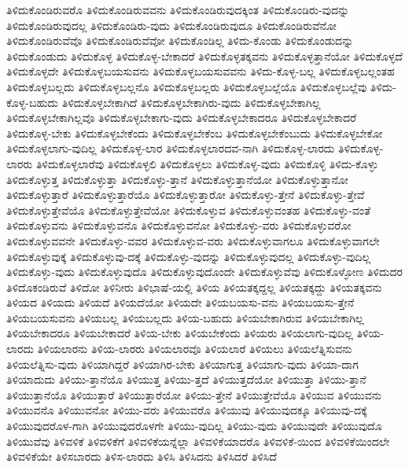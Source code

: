 {ತಿಳಿದುಕೊಂಡಿರುವರೊ
ತಿಳಿದುಕೊಂಡಿರುವವನು
ತಿಳಿದುಕೊಂಡಿರುವುದಕ್ಕಿಂತ
ತಿಳಿದುಕೊಂಡಿರು-ವುದನ್ನು
ತಿಳಿದುಕೊಂಡಿರುವುದಲ್ಲ
ತಿಳಿದುಕೊಂಡಿರು-ವುದು
ತಿಳಿದುಕೊಂಡಿರುವುದೂ
ತಿಳಿದುಕೊಂಡಿರುವೆನೋ
ತಿಳಿದುಕೊಂಡಿರುವೆವೊ
ತಿಳಿದುಕೊಂಡಿರುವೆವೋ
ತಿಳಿದುಕೊಂಡಿಲ್ಲ
ತಿಳಿದು-ಕೊಂಡು
ತಿಳಿದುಕೊಂಡುದನ್ನು
ತಿಳಿದುಕೊಂಡುದು
ತಿಳಿದುಕೊಳ್ಳ
ತಿಳಿದುಕೊಳ್ಳ-ಬೇಕಾದರೆ
ತಿಳಿದುಕೊಳ್ಳತಕ್ಕವನು
ತಿಳಿದುಕೊಳ್ಳತ್ತಾನೆಯೋ
ತಿಳಿದುಕೊಳ್ಳದೆ
ತಿಳಿದುಕೊಳ್ಳದೇ
ತಿಳಿದುಕೊಳ್ಳಬಯಸುವನು
ತಿಳಿದುಕೊಳ್ಳಬಯಸುವವನು
ತಿಳಿದು-ಕೊಳ್ಳ-ಬಲ್ಲ
ತಿಳಿದುಕೊಳ್ಳಬಲ್ಲಂತಹ
ತಿಳಿದುಕೊಳ್ಳಬಲ್ಲದು
ತಿಳಿದುಕೊಳ್ಳಬಲ್ಲನೊ
ತಿಳಿದುಕೊಳ್ಳಬಲ್ಲರು
ತಿಳಿದುಕೊಳ್ಳಬಲ್ಲೆಯೊ
ತಿಳಿದುಕೊಳ್ಳಬಲ್ಲೆವು
ತಿಳಿದು-ಕೊಳ್ಳ-ಬಹುದು
ತಿಳಿದುಕೊಳ್ಳಬೇಕಾಗಿದೆ
ತಿಳಿದುಕೊಳ್ಳಬೇಕಾಗಿರು-ವುದು
ತಿಳಿದುಕೊಳ್ಳಬೇಕಾಗಿಲ್ಲ
ತಿಳಿದುಕೊಳ್ಳಬೇಕಾಗಿಲ್ಲವೊ
ತಿಳಿದುಕೊಳ್ಳಬೇಕಾಗು-ವುದು
ತಿಳಿದುಕೊಳ್ಳಬೇಕಾದರೂ
ತಿಳಿದುಕೊಳ್ಳಬೇಕಾದರೆ
ತಿಳಿದುಕೊಳ್ಳ-ಬೇಕು
ತಿಳಿದುಕೊಳ್ಳಬೇಕೆಂದು
ತಿಳಿದುಕೊಳ್ಳಬೇಕೆಂಬ
ತಿಳಿದುಕೊಳ್ಳಬೇಕೆಂಬುದು
ತಿಳಿದುಕೊಳ್ಳಬೇಕೋ
ತಿಳಿದುಕೊಳ್ಳಲಾಗು-ವುದಿಲ್ಲ
ತಿಳಿದುಕೊಳ್ಳ-ಲಾರ
ತಿಳಿದುಕೊಳ್ಳಲಾರದವ-ನಾಗಿ
ತಿಳಿದುಕೊಳ್ಳ-ಲಾರದು
ತಿಳಿದುಕೊಳ್ಳ-ಲಾರರು
ತಿಳಿದುಕೊಳ್ಳಲಾರೆವು
ತಿಳಿದುಕೊಳ್ಳಲಿ
ತಿಳಿದುಕೊಳ್ಳಲು
ತಿಳಿದುಕೊಳ್ಳ-ವುದು
ತಿಳಿದುಕೊಳ್ಳಿ
ತಿಳಿದು-ಕೊಳ್ಳು
ತಿಳಿದುಕೊಳ್ಳುತ್ತ
ತಿಳಿದುಕೊಳ್ಳುತ್ತಾ
ತಿಳಿದುಕೊಳ್ಳು-ತ್ತಾನೆ
ತಿಳಿದುಕೊಳ್ಳುತ್ತಾನೆಯೋ
ತಿಳಿದುಕೊಳ್ಳುತ್ತಾನೋ
ತಿಳಿದುಕೊಳ್ಳುತ್ತಾರೆ
ತಿಳಿದುಕೊಳ್ಳುತ್ತಾರೆಯೊ
ತಿಳಿದುಕೊಳ್ಳುತ್ತಾರೋ
ತಿಳಿದುಕೊಳ್ಳು-ತ್ತೇನೆ
ತಿಳಿದುಕೊಳ್ಳು-ತ್ತೇವೆ
ತಿಳಿದುಕೊಳ್ಳುತ್ತೇವೆಯೊ
ತಿಳಿದುಕೊಳ್ಳುತ್ತೇವೆಯೋ
ತಿಳಿದುಕೊಳ್ಳುವ
ತಿಳಿದುಕೊಳ್ಳುವಂತಹ
ತಿಳಿದುಕೊಳ್ಳು-ವಂತೆ
ತಿಳಿದುಕೊಳ್ಳುವನು
ತಿಳಿದುಕೊಳ್ಳುವನೊ
ತಿಳಿದುಕೊಳ್ಳುವನೋ
ತಿಳಿದುಕೊಳ್ಳು-ವರು
ತಿಳಿದುಕೊಳ್ಳುವರೋ
ತಿಳಿದುಕೊಳ್ಳುವವನೇ
ತಿಳಿದುಕೊಳ್ಳು-ವವರ
ತಿಳಿದುಕೊಳ್ಳುವ-ವರು
ತಿಳಿದುಕೊಳ್ಳುವಾಗಲೂ
ತಿಳಿದುಕೊಳ್ಳುವಾಗಲೇ
ತಿಳಿದುಕೊಳ್ಳುವುಕ್ಕೆ
ತಿಳಿದುಕೊಳ್ಳುವು-ದಕ್ಕೆ
ತಿಳಿದುಕೊಳ್ಳು-ವುದನ್ನು
ತಿಳಿದುಕೊಳ್ಳುವುದಲ್ಲ
ತಿಳಿದುಕೊಳ್ಳು-ವುದಿಲ್ಲ
ತಿಳಿದುಕೊಳ್ಳು-ವುದು
ತಿಳಿದುಕೊಳ್ಳುವುದೊ
ತಿಳಿದುಕೊಳ್ಳುವುದೊಂದೇ
ತಿಳಿದುಕೊಳ್ಳುವೆವು
ತಿಳಿದುಕೊಳ್ಳೋಣ
ತಿಳಿದುದರ
ತಿಳಿದೊಕಂಡಿರುವೆ
ತಿಳಿದೋ
ತಿಳಿನೀರು
ತಿಳಿಭಾಷೆ-ಯಲ್ಲಿ
ತಿಳಿಯ
ತಿಳಿಯತಕ್ಕದ್ದಲ್ಲ
ತಿಳಿಯತಕ್ಕದ್ದು
ತಿಳಿಯತಕ್ಕವನು
ತಿಳಿಯದ
ತಿಳಿಯದು
ತಿಳಿಯದೆ
ತಿಳಿಯದೆಯೋ
ತಿಳಿಯದೇ
ತಿಳಿಯಬಯಸು-ವನು
ತಿಳಿಯಬಯಸು-ತ್ತೇನೆ
ತಿಳಿಯಬಯಸುವನು
ತಿಳಿಯಬಲ್ಲ
ತಿಳಿಯಬಲ್ಲದು
ತಿಳಿಯ-ಬಹುದು
ತಿಳಿಯಬೇಕಾಗಿರುವ
ತಿಳಿಯಬೇಕಾಗಿಲ್ಲ
ತಿಳಿಯಬೇಕಾದರೂ
ತಿಳಿಯಬೇಕಾದರೆ
ತಿಳಿಯ-ಬೇಕು
ತಿಳಿಯಬೇಕೆಂದು
ತಿಳಿಯರು
ತಿಳಿಯಲಾಗು-ವುದಿಲ್ಲ
ತಿಳಿಯ-ಲಾರದು
ತಿಳಿಯಲಾರನು
ತಿಳಿಯ-ಲಾರರು
ತಿಳಿಯಲಾರವೊ
ತಿಳಿಯಲಾರೆ
ತಿಳಿಯಲು
ತಿಳಿಯಲೆತ್ನಿಸುವನು
ತಿಳಿಯಲೆತ್ನಿಸು-ವುದು
ತಿಳಿಯಾಗಿದ್ದರೆ
ತಿಳಿಯಾಗಿರ-ಬೇಕು
ತಿಳಿಯಾಗುತ್ತ
ತಿಳಿಯಾಗು-ವುದು
ತಿಳಿಯಾ-ದಾಗ
ತಿಳಿಯಾದುದು
ತಿಳಿಯು-ತ್ತಾನೆಯೊ
ತಿಳಿಯುತ್ತ
ತಿಳಿಯು-ತ್ತದೆ
ತಿಳಿಯುತ್ತದೆಯೋ
ತಿಳಿಯುತ್ತಾ
ತಿಳಿಯು-ತ್ತಾನೆ
ತಿಳಿಯುತ್ತಾನೆಯೊ
ತಿಳಿಯುತ್ತಾರೆ
ತಿಳಿಯುತ್ತಾರೆಯೋ
ತಿಳಿಯು-ತ್ತೇನೆ
ತಿಳಿಯುತ್ತೇವೆಯೊ
ತಿಳಿಯುವ
ತಿಳಿಯುವನು
ತಿಳಿಯುವನೊ
ತಿಳಿಯುವನೋ
ತಿಳಿಯು-ವರು
ತಿಳಿಯುವರೊ
ತಿಳಿಯುವು
ತಿಳಿಯುವುದಕ್ಕೂ
ತಿಳಿಯುವು-ದಕ್ಕೆ
ತಿಳಿಯುವುದರೊಳ-ಗಾಗಿ
ತಿಳಿಯುವುದರೊಳಗೇ
ತಿಳಿಯು-ವುದಿಲ್ಲ
ತಿಳಿಯು-ವುದು
ತಿಳಿಯುವುದೇ
ತಿಳಿಯುವುದೊ
ತಿಳಿಯುವೆವು
ತಿಳಿವಳಿಕೆ
ತಿಳಿವಳಿಕೆಗೆ
ತಿಳಿವಳಿಕೆಯನ್ನೆಲ್ಲಾ
ತಿಳಿವಳಿಕೆಯಾದರೊ
ತಿಳಿವಳಿಕೆ-ಯಿಂದ
ತಿಳಿವಳಿಕೆಯಿಂದಲೇ
ತಿಳಿವಳಿಕೆಯೇ
ತಿಳಿಸಬಾರದು
ತಿಳಿಸ-ಲಾರದು
ತಿಳಿಸಿ
ತಿಳಿಸಿದನು
ತಿಳಿಸಿದರೆ
ತಿಳಿಸಿದೆ
}
